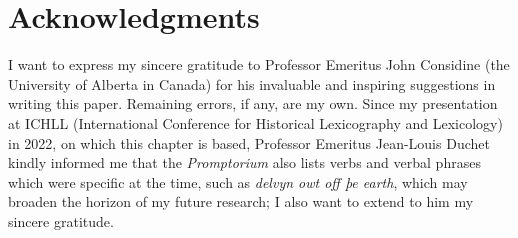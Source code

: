 \documentclass[output=paper,colorlinks,citecolor=brown,arabicfont,chinesefont]{langscibook}
\begin{document}
\section*{Acknowledgments}
\largerpage
I want to express my sincere gratitude to Professor Emeritus John Considine (the University of Alberta in Canada) for his invaluable and inspiring suggestions in writing this paper. Remaining errors, if any, are my own. Since my presentation at ICHLL (International Conference for Historical Lexicography and Lexicology) in 2022, on which this chapter is based, Professor Emeritus Jean-Louis Duchet kindly informed me that the \emph{Promptorium} also lists verbs and verbal phrases which were specific at the time, such as \emph{delvyn owt off þe earth}, which may broaden the horizon of my future research; I also want to extend to him my sincere gratitude.

{\sloppy\printbibliography[heading=subbibliography,notkeyword=this]}
\end{document}
